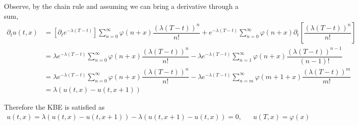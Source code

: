 \begin{solution}[Solution]
\begin{enumerate}[label=(\alph*)]
        Observe, by the chain rule and assuming we can bring a derivative through a sum,
        \begin{align*}
            \partial_t u(t,x) 
            &= \left[ \partial_t e^{-\lambda(T-t)} \right] \sum_{n=0}^{\infty} \varphi(n+x) \dfrac{(\lambda(T-t))^n}{n!} 
            + e^{-\lambda(T-t)} \sum_{n=0}^{\infty} \varphi(n+x) \partial_t \left[ \dfrac{(\lambda(T-t))^n}{n!} \right]
            \\&= \lambda e^{-\lambda(T-t)} \sum_{n=0}^{\infty} \varphi(n+x) \dfrac{(\lambda(T-t))^n}{n!} 
            - \lambda e^{-\lambda(T-t)} \sum_{n=1}^{\infty} \varphi(n+x) \dfrac{(\lambda(T-t))^{n-1}}{(n-1)!} 
            \\&= \lambda e^{-\lambda(T-t)} \sum_{n=0}^{\infty} \varphi(n+x) \dfrac{(\lambda(T-t))^n}{n!} 
            - \lambda e^{-\lambda(T-t)} \sum_{n=m}^{\infty} \varphi(m+1+x) \dfrac{(\lambda(T-t))^{m}}{m!}
            \\&= \lambda(u(t,x) - u(t,x+1))
        \end{align*}
        
        Therefore the KBE is satisfied as
        \begin{align*}
            [\partial_t+\mathcal{A}] u(t,x)
            = \lambda(u(t,x) - u(t,x+1)) - \lambda(u(t,x+1)-u(t,x)) = 0,
            && 
            u(T,x) = \varphi(x) 
        \end{align*}
         
\end{enumerate}
\end{solution}

\begin{problem}[Exercise 10.2]

\end{problem}

\begin{solution}[Solution]
    
\end{solution}



